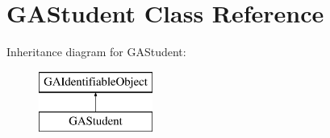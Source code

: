 \hypertarget{class_g_a_student}{}\section{G\+A\+Student Class Reference}
\label{class_g_a_student}
Inheritance diagram for G\+A\+Student\+:\begin{figure}[H]
\begin{center}
\leavevmode
\includegraphics[height=2.000000cm]{class_g_a_student}
\end{center}
\end{figure}
